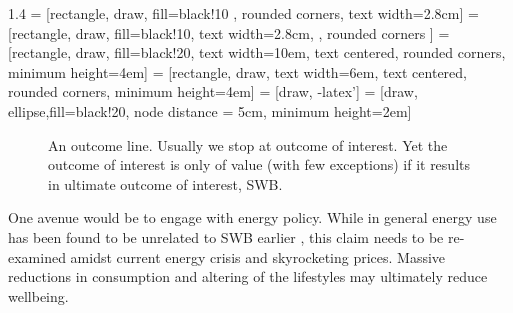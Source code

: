 \documentclass[10pt, letterpaper]{article}
\begin{document}
\begin{spacing}{1.4}
 = [rectangle, draw, fill=black!10
    , rounded corners,  text width=2.8cm]  %
 = [rectangle, draw,  fill=black!10,   text width=2.8cm, , rounded corners  %
]
 = [rectangle, draw, fill=black!20, 
    text width=10em, text centered, rounded corners, minimum height=4em]
 = [rectangle, draw,  
    text width=6em, text centered, rounded corners, minimum height=4em]
 = [draw, -latex']
 = [draw, ellipse,fill=black!20, node distance = 5cm,
    minimum height=2em]
   
    \begin{figure}[H]
      \centering

    \caption{An outcome line. Usually we stop at {outcome of
        interest}. Yet the  {outcome of
      interest} is only of value (with few exceptions)  if it results in ultimate outcome of interest, SWB.}
\label{fOL}
\end{figure}

One avenue would be to engage with energy policy. While in general energy use
has been found to be unrelated to SWB earlier \citep{okulicz19}, this claim 
needs to be re-examined amidst current energy crisis and skyrocketing
prices. Massive reductions in consumption and altering of the lifestyles may
ultimately reduce wellbeing. 
 
   
 

\end{spacing}
\end{document}
